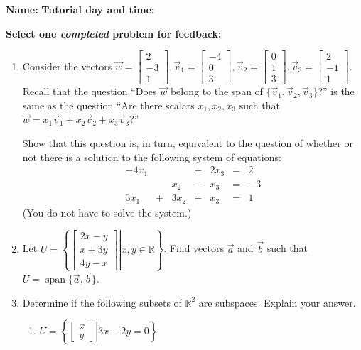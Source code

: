 \documentclass[12pt]{article}
\newcommand{\R}{\mathbb{R}}
\newcommand{\bbm}{\begin{bmatrix}}
\newcommand{\ebm}{\end{bmatrix}}
\begin{document}
{\bf \large Name:} \hspace{2.5in} {\bf Tutorial day and time:}

\bigskip

{\bf Select {\bf one} {\em completed} problem for feedback:}

\bigskip


\thispagestyle{fancy}
 \begin{enumerate}
 
\item Consider the vectors $\vec{w} = \bbm 2\\-3\\1\ebm, \vec{v}_1 = \bbm -4\\0\\3\ebm, \vec{v}_2 = \bbm 0\\1\\3\ebm, \vec{v}_3=\bbm 2\\-1\\1\ebm$.\\
Recall that the question ``Does $\vec{w}$ belong to the span of $\{\vec{v}_1,\vec{v}_2,\vec{v}_3\}$?'' is the same as the question ``Are there scalars $x_1,x_2,x_3$ such that $\vec{w} = x_1\vec{v}_1+x_2\vec{v}_2+x_3\vec{v}_3$?''

Show that this question is, in turn, equivalent to the question of whether or not there is a solution to the following system of equations:
\[
 \begin{array}{ccccccc}
  -4x_1 & & &+&2x_3&=&2\\
   & &x_2&-&x_3&=&-3\\
 3x_1&+&3x_2&+&x_3&=&1
 \end{array}
\]
(You do not have to solve the system.)

\vspace{3in}

\item Let $U = \left\{\left.\bbm 2x-y\\x+3y\\4y-x\ebm \right|x,y\in\R\right\}$. Find vectors $\vec{a}$ and $\vec{b}$ such that $U=\operatorname{span}\{\vec{a},\vec{b}\}$.

\newpage

\item Determine if the following subsets of $\R^2$ are subspaces. Explain your answer.
\begin{enumerate}
 \item $U=\left\{\left.\bbm x\\y\ebm \right| 3x-2y=0\right\}$


\end{enumerate}
\end{enumerate}
\end{document}
